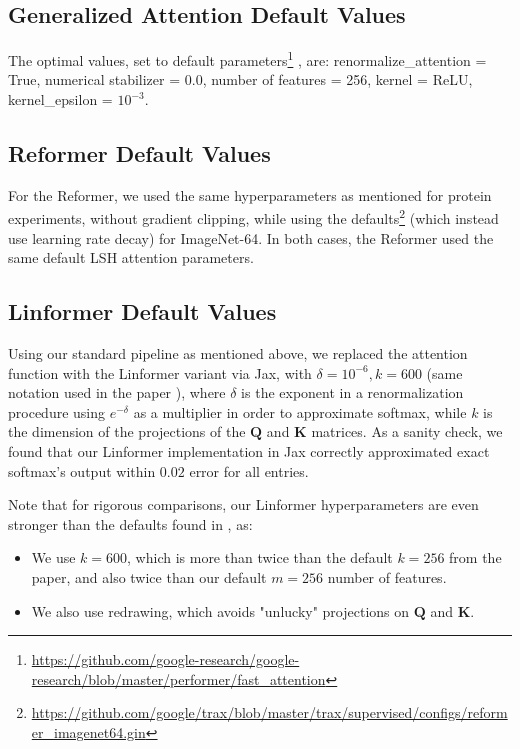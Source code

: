 \subsection{Generalized Attention Default Values} \label{subsec:generalized_default} The optimal values, set to default parameters\footnote{\url{https://github.com/google-research/google-research/blob/master/performer/fast_attention}}
, are: renormalize\_attention = True, numerical stabilizer = 0.0, number of features = 256, kernel = ReLU, kernel\_epsilon = $10^{-3}$. 

\subsection{Reformer Default Values} \label{subsec:reformer_default}
For the Reformer, we used the same hyperparameters as mentioned for protein experiments, without gradient clipping, while using the defaults\footnote{\url{https://github.com/google/trax/blob/master/trax/supervised/configs/reformer_imagenet64.gin}} (which instead use learning rate decay) for ImageNet-64. In both cases, the Reformer used the same default LSH attention parameters.

\subsection{Linformer Default Values} \label{subsec:linformer_default}
Using our standard pipeline as mentioned above, we replaced the attention function with the Linformer variant via Jax, with $\delta = 10^{-6}, k=600$ (same notation used in the paper \citep{linformer}), where $\delta$ is the exponent in a renormalization procedure using $e^{-\delta}$ as a multiplier in order to approximate softmax, while $k$ is the dimension of the projections of the $\mathbf{Q}$ and $\mathbf{K}$ matrices. As a sanity check, we found that our Linformer implementation in Jax correctly approximated exact softmax's output within $0.02$ error for all entries.

Note that for rigorous comparisons, our Linformer hyperparameters are even stronger than the defaults found in \citep{linformer}, as:

\begin{itemize}
\item We use $k=600$, which is more than twice than the default $k=256$ from the paper, and also twice than our default $m = 256$ number of features.
\item We also use redrawing, which avoids "unlucky" projections on $\mathbf{Q}$ and $\mathbf{K}$. 
\end{itemize}


